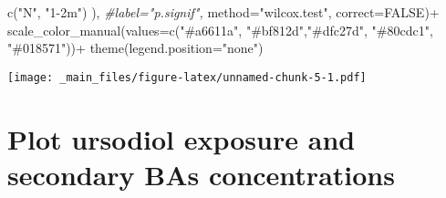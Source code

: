 \documentclass[
]{book}
\newenvironment{Shaded}{\begin{snugshade}}{\end{snugshade}}
\newcommand{\AttributeTok}[1]{\textcolor[rgb]{0.77,0.63,0.00}{#1}}
\newcommand{\CommentTok}[1]{\textcolor[rgb]{0.56,0.35,0.01}{\textit{#1}}}
\newcommand{\ConstantTok}[1]{\textcolor[rgb]{0.00,0.00,0.00}{#1}}
\newcommand{\FunctionTok}[1]{\textcolor[rgb]{0.00,0.00,0.00}{#1}}
\newcommand{\NormalTok}[1]{#1}
\newcommand{\SpecialCharTok}[1]{\textcolor[rgb]{0.00,0.00,0.00}{#1}}
\newcommand{\StringTok}[1]{\textcolor[rgb]{0.31,0.60,0.02}{#1}}
\begin{document}
\begin{Shaded}
\begin{Highlighting}[]
                                       \FunctionTok{c}\NormalTok{(}\StringTok{"N"}\NormalTok{, }\StringTok{"1{-}2m"}\NormalTok{)}
\NormalTok{  ),}
  \CommentTok{\#label="p.signif",}
  \AttributeTok{method=}\StringTok{"wilcox.test"}\NormalTok{,}
  \AttributeTok{correct=}\ConstantTok{FALSE}\NormalTok{)}\SpecialCharTok{+}
  \FunctionTok{scale\_color\_manual}\NormalTok{(}\AttributeTok{values=}\FunctionTok{c}\NormalTok{(}\StringTok{"\#a6611a"}\NormalTok{, }\StringTok{"\#bf812d"}\NormalTok{,}\StringTok{"\#dfc27d"}\NormalTok{, }\StringTok{"\#80cdc1"}\NormalTok{, }\StringTok{"\#018571"}\NormalTok{))}\SpecialCharTok{+}
  \FunctionTok{theme}\NormalTok{(}\AttributeTok{legend.position=}\StringTok{"none"}\NormalTok{)}
\end{Highlighting}
\end{Shaded}

\texttt{[image: \_main\_files/figure-latex/unnamed-chunk-5-1.pdf]}

\hypertarget{plot-ursodiol-exposure-and-secondary-bas-concentrations}{%
\section{Plot ursodiol exposure and secondary BAs concentrations}\label{plot-ursodiol-exposure-and-secondary-bas-concentrations}}
\end{document}
